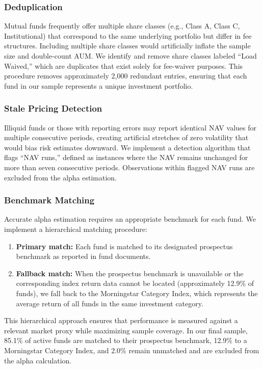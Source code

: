 \documentclass[11pt, a4paper]{article}
\begin{document}
\subsubsection{Deduplication}

Mutual funds frequently offer multiple share classes (e.g., Class A, Class C, Institutional) that correspond to the same underlying portfolio but differ in fee structures. Including multiple share classes would artificially inflate the sample size and double-count AUM. We identify and remove share classes labeled ``Load Waived,'' which are duplicates that exist solely for fee-waiver purposes. This procedure removes approximately 2,000 redundant entries, ensuring that each fund in our sample represents a unique investment portfolio.

\subsubsection{Stale Pricing Detection}

Illiquid funds or those with reporting errors may report identical NAV values for multiple consecutive periods, creating artificial stretches of zero volatility that would bias risk estimates downward. We implement a detection algorithm that flags ``NAV runs,'' defined as instances where the NAV remains unchanged for more than seven consecutive periods. Observations within flagged NAV runs are excluded from the alpha estimation.

\subsubsection{Benchmark Matching}

Accurate alpha estimation requires an appropriate benchmark for each fund. We implement a hierarchical matching procedure:
\begin{enumerate}
    \item \textbf{Primary match:} Each fund is matched to its designated prospectus benchmark as reported in fund documents.
    \item \textbf{Fallback match:} When the prospectus benchmark is unavailable or the corresponding index return data cannot be located (approximately 12.9\% of funds), we fall back to the Morningstar Category Index, which represents the average return of all funds in the same investment category.
\end{enumerate}
This hierarchical approach ensures that performance is measured against a relevant market proxy while maximizing sample coverage. In our final sample, 85.1\% of active funds are matched to their prospectus benchmark, 12.9\% to a Morningstar Category Index, and 2.0\% remain unmatched and are excluded from the alpha calculation.
\end{document}
